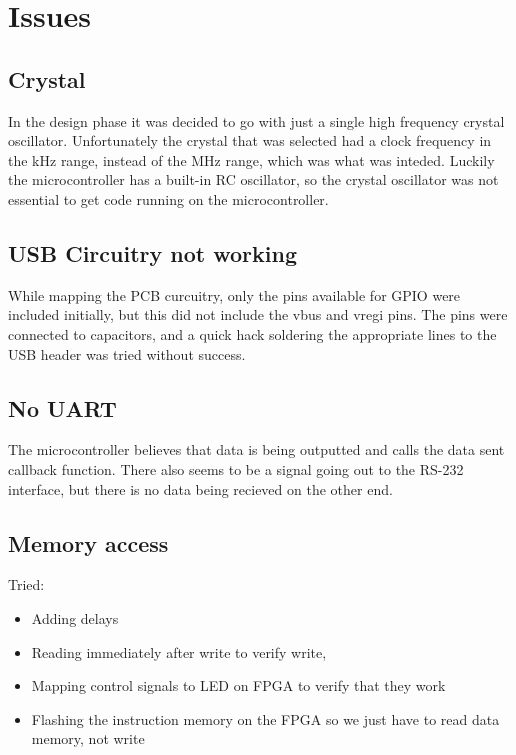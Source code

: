 \section{Issues}
\subsection{Crystal}
In the design phase it was decided to go with just a single high frequency crystal oscillator.
Unfortunately the crystal that was selected had a clock frequency in the kHz range, instead of the MHz range, which was what was inteded.
Luckily the microcontroller has a built-in RC oscillator, so the crystal oscillator was not essential to get code running on the microcontroller.

\subsection{USB Circuitry not working}
While mapping the PCB curcuitry, only the pins available for GPIO were included initially, but this did not include the vbus and vregi pins.
The pins were connected to capacitors, and a quick hack soldering the appropriate lines to the USB header was tried without success.

\subsection{No UART}
The microcontroller believes that data is being outputted and calls the data sent callback function.
There also seems to be a signal going out to the RS-232 interface, but there is no data being recieved on the other end.

\subsection{Memory access}
Tried:
\begin{itemize}
    \item Adding delays
    \item Reading immediately after write to verify write,
    \item Mapping control signals to LED on FPGA to verify that they work
    \item Flashing the instruction memory on the FPGA so we just have to read data memory, not write
\end{itemize}
